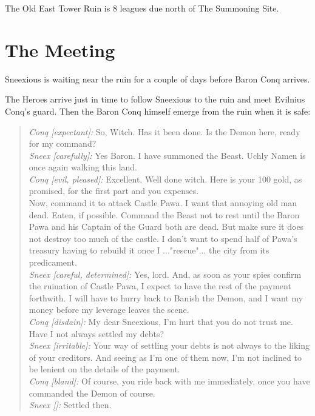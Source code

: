 \documentclass[11pt, twoside, titlepage, a4paper]{report}
\newenvironment{readoutloud}%
{\begin{quote}\begin{itshape}}%
{\end{itshape}\end{quote}}%
\begin{document}
The Old East Tower Ruin is 8 leagues due north of The Summoning Site.


\section*{The Meeting}
Sneexious is waiting near the ruin for a couple of days before Baron Conq arrives.

The Heroes arrive just in time to follow Sneexious to the ruin and meet Evilnius Conq's guard. Then the Baron Conq himself emerge from the ruin when it is safe:

\begin{readoutloud}
\emph{Conq [expectant]:} So, Witch. Has it been done. Is the Demon here, ready for my command? \\
\emph{Sneex [carefully]:} Yes Baron. I have summoned the Beast. Uchly Namen is once again walking this land. \\
\emph{Conq [evil, pleased]:} Excellent. Well done witch. Here is your 100 gold, as promised, for the first part and you expenses. \\
Now, command it to attack Castle Pawa. I want that annoying old man dead. Eaten, if possible. Command the Beast not to rest until the Baron Pawa and his Captain of the Guard both are dead. But make sure it does not destroy too much of the castle. I don't want to spend half of Pawa's treasury having to rebuild it once I ..."rescue"... the city from its predicament. \\
\emph{Sneex [careful, determined]:} Yes, lord. And, as soon as your spies confirm the ruination of Castle Pawa, I expect to have the rest of the payment forthwith. I will have to hurry back to Banish the Demon, and I want my money before my leverage leaves the scene. \\
\emph{Conq [disdain]:} My dear Sneexious, I'm hurt that you do not trust me. Have I not always settled my debts? \\
\emph{Sneex [irritable]:} Your way of settling your debts is not always to the liking of your creditors. And seeing as I'm one of them now, I'm not inclined to be lenient on the details of the payment. \\
\emph{Conq [bland]:} Of course, you ride back with me immediately, once you have commanded the Demon of course. \\
\emph{Sneex []:} Settled then. \\
\end{readoutloud}
\end{document}
